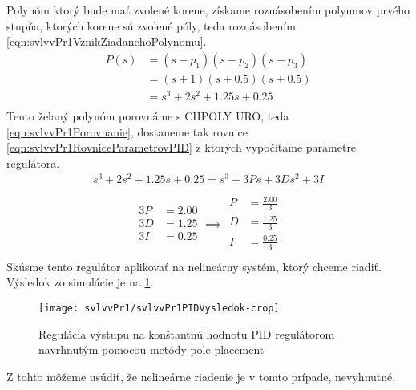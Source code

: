 \documentclass[../main.tex]{subfiles}
\begin{document}
	Polynóm ktorý bude mať zvolené korene, získame roznásobením polynmov prvého stupňa, ktorých korene sú zvolené póly, teda roznásobením \cref{eqn:svlvvPr1VznikZiadanehoPolynomu}. 
		\begin{equation}
	\begin{aligned}
	P(s) &= (s - p_1)(s - p_2)(s - p_3) \\
		 &= (s + 1)(s + 0.5)(s + 0.5) \\
		 &= s^3 + 2s^2 + 1.25s + 0.25\\
	\end{aligned}
	\label{eqn:svlvvPr1VznikZiadanehoPolynomu}
	\end{equation}
	Tento želaný polynóm porovnáme s CHPOLY URO, teda \cref{eqn:svlvvPr1Porovnanie}, dostaneme tak rovnice \cref{eqn:svlvvPr1RovniceParametrovPID} z ktorých vypočítame parametre regulátora.
	\begin{equation}
	\begin{aligned}
		s^3 + 2s^2 + 1.25s + 0.25= s^3 + 3Ps + 3Ds^2 + 3I\\
	\end{aligned}
	\label{eqn:svlvvPr1Porovnanie}
	\end{equation}
	\begin{equation}
	\begin{aligned}
		\begin{matrix}
		3P &= 2.00 \\
		3D &= 1.25 \\ 
		3I &= 0.25 \\
		\end{matrix}
		\implies 
		\begin{matrix}
		P &= \frac{2.00}{3} \\
		D &= \frac{1.25}{3} \\ 
		I &= \frac{0.25}{3}  \\
		\end{matrix}
	\end{aligned}
	\label{eqn:svlvvPr1RovniceParametrovPID}
	\end{equation}
	Skúsme tento regulátor aplikovať na nelineárny systém, ktorý chceme riadiť. Výsledok zo simulácie je na \cref{fig:svlvPr1VysledokPID}.
		\begin{figure}[h!]
			\centering
		\texttt{[image: svlvvPr1/svlvvPr1PIDVysledok-crop]}
		\caption{Regulácia výstupu na konštantnú hodnotu PID regulátorom navrhnutým pomocou metódy pole-placement}
		\label{fig:svlvPr1VysledokPID}
	\end{figure}
	Z tohto môžeme usúdiť, že nelineárne riadenie je v tomto prípade, nevyhnutné.
	
\end{document}
